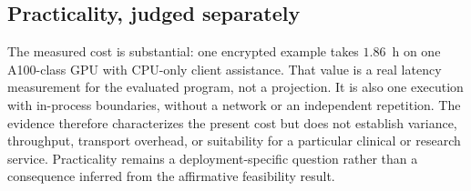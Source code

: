 \subsection{Practicality, judged separately}
\label{sec:verdict-practicality}

The measured cost is substantial: one encrypted example takes $1.86$~h on one A100-class GPU with
CPU-only client assistance. That value is a real latency measurement for the evaluated program,
not a projection. It is also one execution with in-process boundaries, without a network or an
independent repetition. The evidence therefore characterizes the present cost but does not establish
variance, throughput, transport overhead, or suitability for a particular clinical or research
service. Practicality remains a deployment-specific question rather than a consequence inferred
from the affirmative feasibility result.

